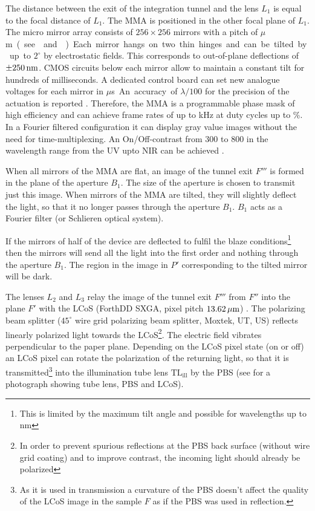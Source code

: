 The distance between the exit of the integration tunnel and the lens
$L_1$ is equal to the focal distance of $L_1$. The MMA is positioned
in the other focal plane of $L_1$. The micro mirror array
\citep{Berndt2007,Schmidt2010,Berndt2010} consists of $256\times 256$
mirrors with a pitch of \unit[16]{$\mu$m} (see  and
). Each mirror hangs on two thin hinges and
can be tilted by up to $2^\circ$ by electrostatic fields. This
corresponds to out-of-plane deflections of $\pm\unit[250]{nm}$.  CMOS
circuits below each mirror allow to maintain a constant tilt for
hundreds of milliseconds. A dedicated control board can set new
analogue voltages for each mirror in \unit[850]{$\mu$s}. An accuracy
of $\lambda/100$ for the precision of the actuation is reported
\citep{Berndt2011}. Therefore, the MMA is a programmable phase mask of
high efficiency and can achieve frame rates of up to \unit[1]{kHz} at
duty cycles up to \unit[50]{\%}. In a Fourier filtered configuration
it can display gray value images without the need for
time-multiplexing.  An On/Off-contrast from 300 to 800 in the
wavelength range from the UV upto NIR can be achieved
\citep{Berndt2011}.

When all mirrors of the MMA are flat, an image of the tunnel exit $F'''$
is formed in the plane of the aperture $B_1$. The size of the aperture
is chosen to transmit just this image. When mirrors of the MMA are
tilted, they will slightly deflect the light, so that it no longer
passes through the aperture $B_1$. $B_1$ acts as a Fourier filter (or
Schlieren optical system).

If the mirrors of half of the device are deflected to fulfil the blaze
conditions\footnote{This is limited by the maximum tilt angle and
  possible for wavelengths up to \unit[1000]{nm}} then the mirrors will
send all the light into the first order and nothing through the
aperture $B_1$.  The region in the image in $P'$ corresponding to the
tilted mirror will be dark.

The lenses $L_2$ and $L_3$ relay the image of the tunnel exit $F'''$
from $F''$ into the plane $F'$ with the LCoS (ForthDD SXGA, pixel
pitch $\unit[13.62]{\mu m}$) \citep{Cartwright2007}. The polarizing
beam splitter ($45^\circ$ wire grid polarizing beam splitter, Moxtek,
UT, US) reflects linearly polarized light towards the LCoS\footnote{In
  order to prevent spurious reflections at the PBS back surface
  (without wire grid coating) and to improve contrast, the incoming
  light should already be polarized}. The electric field vibrates
perpendicular to the paper plane. Depending on the LCoS pixel state
(on or off) an LCoS pixel can rotate the polarization of the returning
light, so that it is transmitted\footnote{As it is used in
  transmission a curvature of the PBS doesn't affect the quality of
  the LCoS image in the sample $F$ as if the PBS was used in
  reflection.}  into the illumination tube lens
$\textrm{TL}_\textrm{ill}$ by the PBS (see  for a
photograph showing tube lens, PBS and LCoS).

